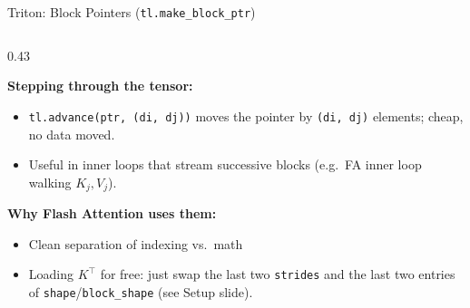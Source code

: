 \begin{frame}[fragile]{Triton: Block Pointers (\texttt{tl.make\_block\_ptr})}
\begin{columns}[T]
\begin{column}{0.43\textwidth}
{    \vspace{0.4em}
    \textbf{Stepping through the tensor:}
    \begin{itemize}\itemsep1pt
      \item \texttt{tl.advance(ptr, (di, dj))} moves the pointer by \texttt{(di, dj)} elements; cheap, no data moved.
      \item Useful in inner loops that stream successive blocks (e.g.\ FA inner loop walking $K_j, V_j$).
    \end{itemize}

    \vspace{0.4em}
    \textbf{Why Flash Attention uses them:}
    \begin{itemize}\itemsep1pt
      \item Clean separation of indexing vs.\ math
      \item Loading $K^\top$ for free: just swap the last two \texttt{strides} and the last two entries of \texttt{shape}/\texttt{block\_shape} (see Setup slide).
    \end{itemize}
    }
  \end{column}
\end{columns}
\end{frame}

